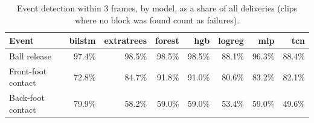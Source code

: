 \begin{table}[htbp]
  \centering
  \caption{Event detection within 3 frames, by model, as a share of all deliveries (clips where no block was found count as failures).}
  \label{tab:models_events}
  \begin{tabular}{lrrrrrrr}
    \toprule
    Event & bilstm & extratrees & forest & hgb & logreg & mlp & tcn \\
    \midrule
    Ball release & 97.4\% & 98.5\% & 98.5\% & 98.5\% & 88.1\% & 96.3\% & 88.4\% \\
    Front-foot contact & 72.8\% & 84.7\% & 91.8\% & 91.0\% & 80.6\% & 83.2\% & 82.1\% \\
    Back-foot contact & 79.9\% & 58.2\% & 59.0\% & 59.0\% & 53.4\% & 59.0\% & 49.6\% \\
    \bottomrule
  \end{tabular}
\end{table}

